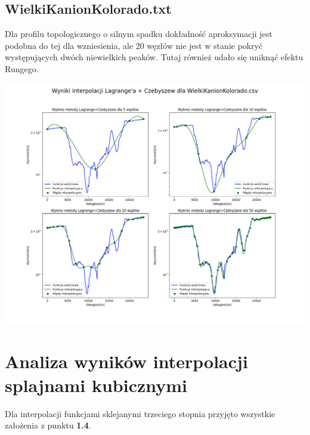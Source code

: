 \documentclass[a4paper,12pt]{article}
\begin{document}
	\subsection{WielkiKanionKolorado.txt}
	Dla profilu topologicznego o silnym spadku dokładność aproksymacji jest podobna do tej dla wzniesienia, ale 20 węzłów nie jest w stanie pokryć występujących dwóch niewielkich peaków. Tutaj również udało się uniknąć efektu Rungego.
	\begin{center}
        \includegraphics[scale=0.4]{../charts/chebyshev_WielkiKanionKolorado.png}
    \end{center}
    
\newpage   
\section{Analiza wyników interpolacji splajnami kubicznymi}
	Dla interpolacji funkcjami sklejanymi trzeciego stopnia przyjęto wszystkie założenia z punktu \textbf{1.4}.
	
\end{document}
